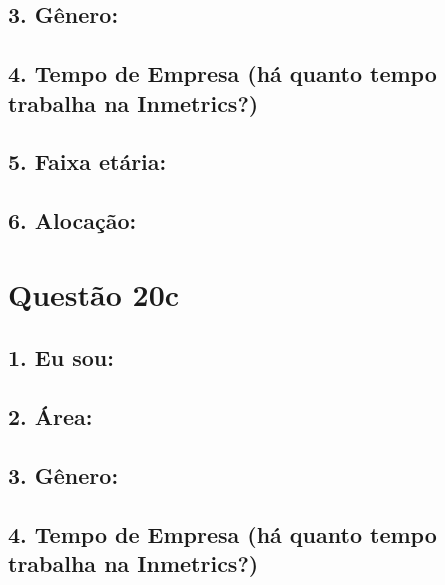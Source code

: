 \documentclass[]{book}
\begin{document}
\hypertarget{genero-54}{%
\subsection{3. Gênero:}\label{genero-54}}

\hypertarget{tempo-de-empresa-ha-quanto-tempo-trabalha-na-inmetrics-54}{%
\subsection{4. Tempo de Empresa (há quanto tempo trabalha na Inmetrics?)}\label{tempo-de-empresa-ha-quanto-tempo-trabalha-na-inmetrics-54}}

\hypertarget{faixa-etaria-54}{%
\subsection{5. Faixa etária:}\label{faixa-etaria-54}}

\hypertarget{alocacao-54}{%
\subsection{6. Alocação:}\label{alocacao-54}}

\hypertarget{questao-20c}{%
\section{Questão 20c}\label{questao-20c}}

\hypertarget{eu-sou-55}{%
\subsection{1. Eu sou:}\label{eu-sou-55}}

\hypertarget{area-55}{%
\subsection{2. Área:}\label{area-55}}

\hypertarget{genero-55}{%
\subsection{3. Gênero:}\label{genero-55}}

\hypertarget{tempo-de-empresa-ha-quanto-tempo-trabalha-na-inmetrics-55}{%
\subsection{4. Tempo de Empresa (há quanto tempo trabalha na Inmetrics?)}\label{tempo-de-empresa-ha-quanto-tempo-trabalha-na-inmetrics-55}}
\end{document}
